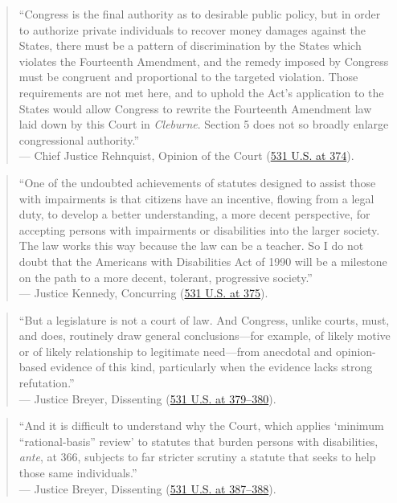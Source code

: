 \documentclass[12pt]{article}
\begin{document}
\begin{quote}
``Congress is the final authority as to desirable public policy, but in order to authorize private individuals to recover money damages against the States, there must be a pattern of discrimination by the States which violates the Fourteenth Amendment, and the remedy imposed by Congress must be congruent and proportional to the targeted violation. Those requirements are not met here, and to uphold the Act's application to the States would allow Congress to rewrite the Fourteenth Amendment law laid down by this Court in \textit{Cleburne}. Section 5 does not so broadly enlarge congressional authority.'' \\
--- Chief Justice Rehnquist, Opinion of the Court (\href{https://supreme.justia.com/cases/federal/us/531/356/}{531 U.S. at 374}).
\end{quote}

\begin{quote}
``One of the undoubted achievements of statutes designed to assist those with impairments is that citizens have an incentive, flowing from a legal duty, to develop a better understanding, a more decent perspective, for accepting persons with impairments or disabilities into the larger society. The law works this way because the law can be a teacher. So I do not doubt that the Americans with Disabilities Act of 1990 will be a milestone on the path to a more decent, tolerant, progressive society.'' \\
--- Justice Kennedy, Concurring (\href{https://supreme.justia.com/cases/federal/us/531/356/}{531 U.S. at 375}).
\end{quote}

\begin{quote}
``But a legislature is not a court of law. And Congress, unlike courts, must, and does, routinely draw general conclusions---for example, of likely motive or of likely relationship to legitimate need---from anecdotal and opinion-based evidence of this kind, particularly when the evidence lacks strong refutation.'' \\
--- Justice Breyer, Dissenting (\href{https://supreme.justia.com/cases/federal/us/531/356/}{531 U.S. at 379--380}).
\end{quote}

\begin{quote}
``And it is difficult to understand why the Court, which applies `minimum ``rational-basis'' review' to statutes that burden persons with disabilities, \textit{ante}, at 366, subjects to far stricter scrutiny a statute that seeks to help those same individuals.'' \\
--- Justice Breyer, Dissenting (\href{https://supreme.justia.com/cases/federal/us/531/356/}{531 U.S. at 387--388}).
\end{quote}
\end{document}

